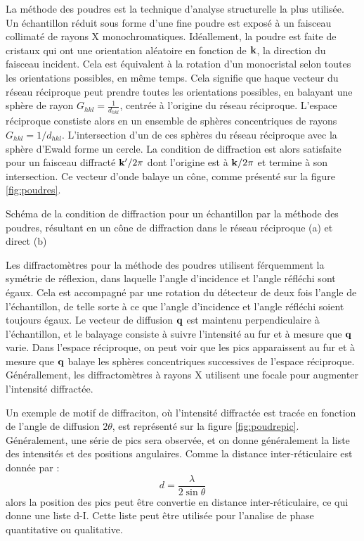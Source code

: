 La méthode des poudres est la technique d'analyse structurelle la plus utilisée. Un échantillon réduit sous forme d'une fine poudre est exposé à un faisceau collimaté de rayons X monochromatiques. Idéallement, la poudre est faite de cristaux qui ont une orientation aléatoire en fonction de $\mathbf{k}$, la direction du faisceau incident. Cela est équivalent à la rotation d'un monocristal selon toutes les orientations possibles, en même temps. Cela signifie que haque vecteur du réseau réciproque peut prendre toutes les orientations possibles, en balayant une sphère de rayon $G_{hkl} = \frac{1}{d_{hkl}}$, centrée à l'origine du réseau réciproque. L'espace réciproque constiste alors en un ensemble de sphères concentriques de rayons $G_{hkl} = 1/ d_{hkl}$. L'intersection d'un de ces sphères du réseau réciproque avec la sphère d'Ewald forme un cercle. La condition de diffraction est alors satisfaite pour un faisceau diffracté $\mathbf{k'}/2\pi$ dont l'origine est à $\mathbf{k}/2\pi$ et termine à son intersection. Ce vecteur d'onde balaye un cône, comme présenté sur la figure \ref{fig:poudres}.

\begin{marginfigure}
    \TODO
    \caption{Schéma de la condition de diffraction pour un échantillon par la méthode des poudres, résultant en un cône de diffraction dans le réseau réciproque (a) et direct (b)}
    \label{fig:poudres}
\end{marginfigure}

Les diffractomètres pour la méthode des poudres utilisent férquemment la symétrie de réflexion, dans laquelle l'angle d'incidence et l'angle réfléchi sont égaux. Cela est accompagné par une rotation du détecteur de deux fois l'angle de l'échantillon, de telle sorte à ce que l'angle d'incidence et l'angle réfléchi soient toujours égaux. Le vecteur de diffusion $\mathbf{q}$ est maintenu perpendiculaire à l'échantillon, et le balayage consiste à suivre l'intensité au fur et à mesure que $\mathbf{q}$ varie. Dans l'espace réciproque, on peut voir que les pics apparaissent au fur et à mesure que $\mathbf{q}$ balaye les sphères concentriques successives de l'espace réciproque.
Générallement, les diffractomètres à rayons X utilisent une focale pour augmenter l'intensité diffractée.

Un exemple de motif de diffraciton, où l'intensité diffractée est tracée en fonction de l'angle de diffusion $2\theta$, est représenté sur la figure \ref{fig:poudrepic}. Généralement, une série de pics sera observée, et on donne généralement la liste des intensités et des positions angulaires. Comme la distance inter-réticulaire est donnée par :
\begin{equation}
    d = \frac{\lambda}{2\sin\theta}
\end{equation}
 alors la position des pics peut être convertie en distance inter-réticulaire, ce qui donne une liste d-I. Cette liste peut être utilisée pour l'analise de phase quantitative ou qualitative.

